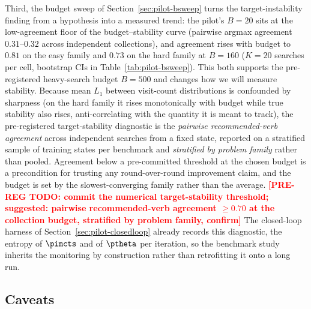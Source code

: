 Third, the budget sweep of Section~\ref{sec:pilot-bsweep} turns the
target-instability finding from a hypothesis into a measured trend: the
pilot's $B = 20$ sits at the low-agreement floor of the
budget--stability curve (pairwise argmax agreement $0.31$--$0.32$
across independent collections), and agreement rises with budget to
$0.81$ on the easy family and $0.73$ on the hard family at $B = 160$
($K = 20$ searches per cell, bootstrap CIs in
Table~\ref{tab:pilot-bsweep}). This both supports the pre-registered
heavy-search budget $B = 500$ and changes how we will measure
stability. Because mean $L_1$ between visit-count distributions is
confounded by sharpness (on the hard family it rises monotonically
with budget while true stability also rises, anti-correlating with the
quantity it is meant to track), the pre-registered target-stability
diagnostic is the \emph{pairwise recommended-verb agreement} across
independent searches from a fixed state, reported on a stratified
sample of training states per benchmark and \emph{stratified by
problem family} rather than pooled. Agreement below a pre-committed
threshold at the chosen budget is a precondition for trusting any
round-over-round improvement claim, and the budget is set by the
slowest-converging family rather than the average.
\textcolor{red}{\textbf{[PRE-REG TODO: commit the numerical
target-stability threshold; suggested: pairwise recommended-verb
agreement $\geq 0.70$ at the collection budget, stratified by problem
family, confirm]}} The closed-loop harness of
Section~\ref{sec:pilot-closedloop} already records this diagnostic, the entropy
of $\pimcts$ and of $\ptheta$ per iteration, so the benchmark study inherits the
monitoring by construction rather than retrofitting it onto a long run.

\subsection{Caveats}
\label{sec:pilot-caveats}

